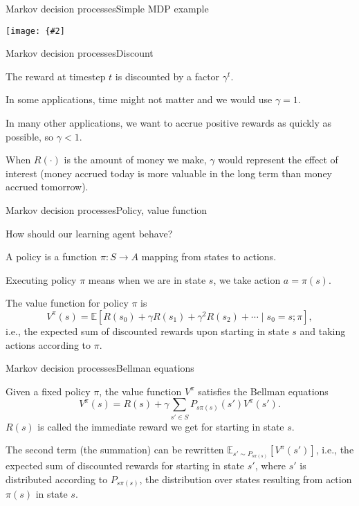 \documentclass{beamer}
\def\Expec{\mathbb{E}}
\newcommand{\myfig}[3]{\centerline{\texttt{[image: \{\#2]}}}
    \centerline{\scriptsize #3}}
\begin{document}
\begin{frame}{Markov decision processes}{Simple MDP example}

\myfig{3in}{mdp}{\url{https://en.wikipedia.org/wiki/Markov_decision_process}}

\end{frame}


\begin{frame}{Markov decision processes}{Discount}

  The reward at timestep $t$ is \alert{discounted} by a factor $\gamma^t$.

  \medskip

  In some applications, time might not matter and we would use $\gamma=1$.

  \medskip

  In many other applications, we want to accrue positive rewards as quickly
  as possible, so $\gamma < 1$.

  \medskip

  When $R(\cdot)$ is the amount of money we make, $\gamma$ would
  represent the effect of interest (money accrued today is more
  valuable in the long term than money accrued tomorrow).

\end{frame}


\begin{frame}{Markov decision processes}{Policy, value function}

  How should our learning agent behave?

  \medskip

  A \alert{policy} is a function $\pi : S \rightarrow A$ mapping from states
  to actions.

  \medskip

  \alert{Executing} policy $\pi$ means when we are in state $s$, we
  take action $a = \pi(s)$.

  \medskip

  The \alert{value function} for policy $\pi$ is
  \[ V^\pi(s)=\Expec[ R(s_0)+\gamma R(s_1)+\gamma^2R(s_2)+\cdots \mid s_0 = s ; \pi], \]
  i.e., the expected sum of discounted rewards upon starting in state
  $s$ and taking actions according to $\pi$.
  
\end{frame}


\begin{frame}{Markov decision processes}{Bellman equations}

  Given a fixed policy $\pi$, the value function $V^\pi$ satisfies the
  \alert{Bellman equations}
  \[ V^\pi(s) = R(s) + \gamma\sum_{s'\in S} P_{s\pi(s)}(s')V^\pi(s') . \]
  $R(s)$ is called the \alert{immediate reward} we get for starting in
  state $s$.

  \medskip

  The second term (the summation) can be rewritten $\Expec_{s' \sim
    P_{s\pi(s)}}[V^\pi(s')]$, i.e., the expected sum of discounted
  rewards for starting in state $s'$, where $s'$ is distributed
  according to $P_{s\pi(s)}$, the distribution over states resulting
  from action $\pi(s)$ in state $s$.

\end{frame}
\end{document}
